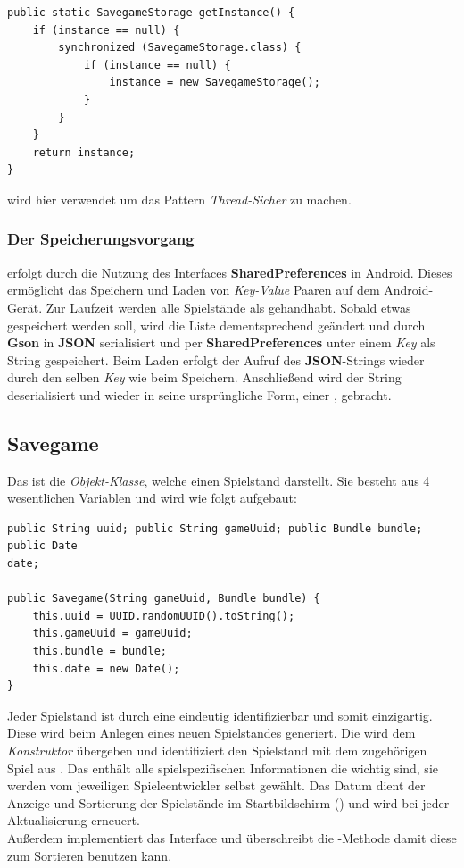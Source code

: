 \begin{lstlisting}[caption={SavegameStorage Singleton},captionpos=b]
public static SavegameStorage getInstance() {
	if (instance == null) {
		synchronized (SavegameStorage.class) {
			if (instance == null) {
				instance = new SavegameStorage();
			}
		}
	}
	return instance;
}
\end{lstlisting}

 wird hier verwendet um das Pattern \emph{Thread-Sicher} zu
machen.

\subsubsection{Der Speicherungsvorgang}

erfolgt durch die Nutzung des Interfaces \textbf{SharedPreferences} in Android.
Dieses ermöglicht das Speichern und Laden von \emph{Key-Value} Paaren auf dem
Android-Gerät. Zur Laufzeit werden alle Spielstände als
 gehandhabt. Sobald etwas gespeichert werden soll,
wird die Liste dementsprechend geändert und durch \textbf{Gson} in \textbf{JSON}
serialisiert und per \textbf{SharedPreferences} unter einem \emph{Key} als
String gespeichert. Beim Laden erfolgt der Aufruf des \textbf{JSON}-Strings
wieder durch den selben \emph{Key} wie beim Speichern. Anschließend wird der
String deserialisiert und wieder in seine ursprüngliche Form, einer 
, gebracht.

\subsection{Savegame}

Das ist die \emph{Objekt-Klasse}, welche einen Spielstand darstellt. Sie besteht
aus 4 wesentlichen Variablen und wird wie folgt aufgebaut:

\begin{lstlisting}[caption={Savegame Variablen \& Konstruktor},captionpos=b]
public String uuid; public String gameUuid; public Bundle bundle; public Date
date;

public Savegame(String gameUuid, Bundle bundle) {
	this.uuid = UUID.randomUUID().toString();
	this.gameUuid = gameUuid;
	this.bundle = bundle;
	this.date = new Date();
}
\end{lstlisting}

Jeder Spielstand ist durch eine  eindeutig identifizierbar und somit
einzigartig. Diese wird beim Anlegen eines neuen Spielstandes generiert.  Die
 wird dem \emph{Konstruktor} übergeben und identifiziert den
Spielstand mit dem zugehörigen Spiel aus .  Das 
enthält alle spielspezifischen Informationen die wichtig sind, sie werden vom
jeweiligen Spieleentwickler selbst gewählt. Das Datum dient der Anzeige und
Sortierung der Spielstände im Startbildschirm () und wird bei jeder
Aktualisierung erneuert.\\ Außerdem implementiert  das Interface
 und überschreibt die -Methode damit
 diese zum Sortieren benutzen kann.

